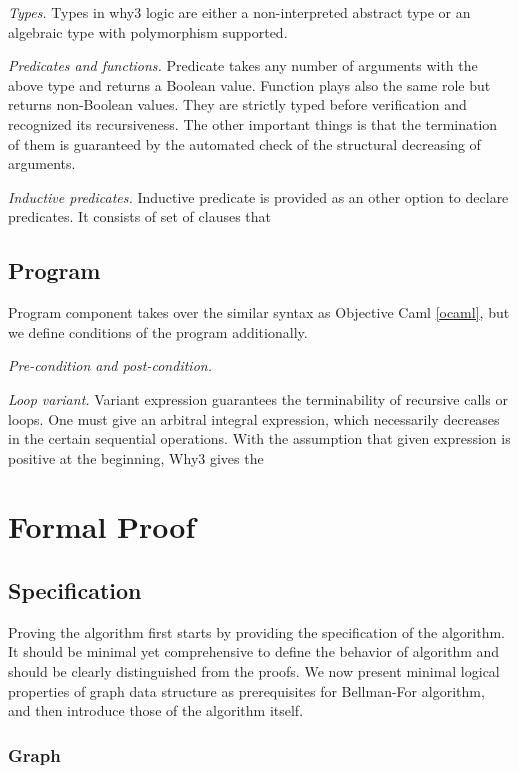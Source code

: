 \documentclass[a4paper,12pt]{article}
\begin{document}
\emph{Types.} Types in why3 logic are either a non-interpreted abstract type or an algebraic type with polymorphism supported.

\emph{Predicates and functions.} Predicate takes any number of arguments with the above type and returns a Boolean value. Function plays also the same role but returns non-Boolean values. They are strictly typed before verification and recognized its recursiveness. The other important things is that the termination of them is guaranteed by the automated check of the structural decreasing of arguments.

\emph{Inductive predicates.} Inductive predicate is provided as an other option to declare predicates. It consists of set of clauses that

\subsection{Program}

Program component takes over the similar syntax as Objective Caml \ref{ocaml}, but we define conditions of the program additionally.

\emph{Pre-condition and post-condition.}

\emph{Loop variant.} Variant expression guarantees the terminability of recursive calls or loops. One must give an arbitral integral expression, which necessarily decreases in the certain sequential operations. With the assumption that given expression is positive at the beginning, Why3 gives the 



\section{Formal Proof}

\subsection{Specification}

Proving the algorithm first starts by providing the specification of the algorithm. It should be minimal yet comprehensive to define the behavior of algorithm and should be clearly distinguished from the proofs. We now present minimal logical properties of graph data structure as prerequisites for Bellman-For algorithm, and then introduce those of the algorithm itself.

\subsubsection{Graph}
\end{document}
